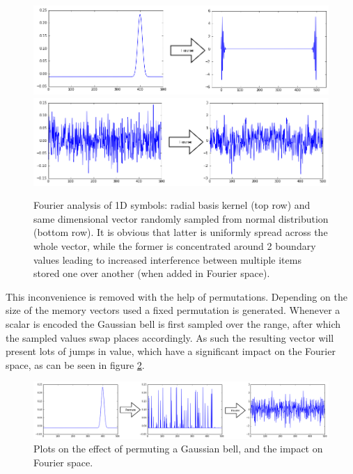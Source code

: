 \documentclass[conference]{IEEEtran}
\begin{document}
	
	\begin{figure}
		\includegraphics[width=\columnwidth]{img/scalar-pre-perm-fft.png}
		\includegraphics[width=\columnwidth]{img/scalar-random-fft.png}
		\caption{Fourier analysis of 1D symbols: radial basis kernel (top row) and same dimensional vector randomly sampled from normal distribution (bottom row). It is obvious that latter is uniformly spread across the whole vector, while the former is concentrated around 2 boundary values leading to increased interference between multiple items stored one over another (when added in Fourier space).}
		\label{fft}
	\end{figure}
	
	This inconvenience is removed with the help of permutations.
Depending on the size of the memory vectors used a fixed permutation is generated.
Whenever a scalar is encoded the Gaussian bell is first sampled over the range, after which the sampled values swap places accordingly.
As such the resulting vector will present lots of jumps in value, which have a significant impact on the Fourier space, as can be seen in figure \ref{perm-fft}.
	
	\begin{figure}
		\includegraphics[width=\columnwidth]{img/scalar-perm-step-fft.png}
		\caption{Plots on the effect of permuting a Gaussian bell, and the impact on Fourier space.}
		\label{perm-fft}
	\end{figure}
	
\end{document}
